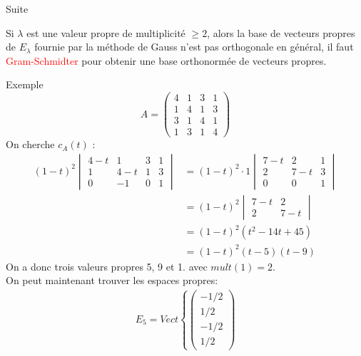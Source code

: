 
\begin{parag}{Suite}

    
\begin{framedremark}
    Si $\lambda$ est une valeur propre de multiplicité $\geq 2$, alors la base de vecteurs propres de $E_\lambda$ fournie par la méthode de Gauss n'est pas orthogonale en général, il faut \textcolor{red}{Gram-Schmidter} pour obtenir une base orthonormée de vecteurs propres.
\end{framedremark}
\begin{subparag}{Exemple}
    \[A = \begin{pmatrix}
        4 & 1 & 3 & 1\\
        1 & 4 & 1 & 3\\
        3 & 1 & 4 & 1\\
        1 & 3 & 1 & 4
    \end{pmatrix}\]
    On cherche $c_A(t)$ :
    \begin{align*}
        (1-t)^2\begin{vmatrix}
            4-t & 1 & 3 & 1\\
            1 & 4-t & 1 & 3\\
            0 & -1 & 0 & 1
        \end{vmatrix} &= (1-t)^2\cdot1\begin{vmatrix}
            7-t & 2 & 1\\
            2 & 7-t & 3\\
            0 & 0 & 1
        \end{vmatrix}\\ 
        &= (1-t)^2\begin{vmatrix}
            7-t  & 2\\
            2 & 7-t
        \end{vmatrix} \\
        &= (1-t)^2(t^2 - 14t + 45)\\
        &= (1-t)^2(t-5)(t-9)
    \end{align*}
    On a donc trois valeurs propres 5, 9 et 1. avec $mult(1) = 2$.
    \\
    On peut maintenant trouver les espaces propres:
\begin{align*}
    E_5 = Vect\left\{\begin{pmatrix}
        -1/2\\
        1/2 \\ -1/2 \\ 1/2

\end{pmatrix}
\end{align*}
\end{subparag}
\end{parag}
